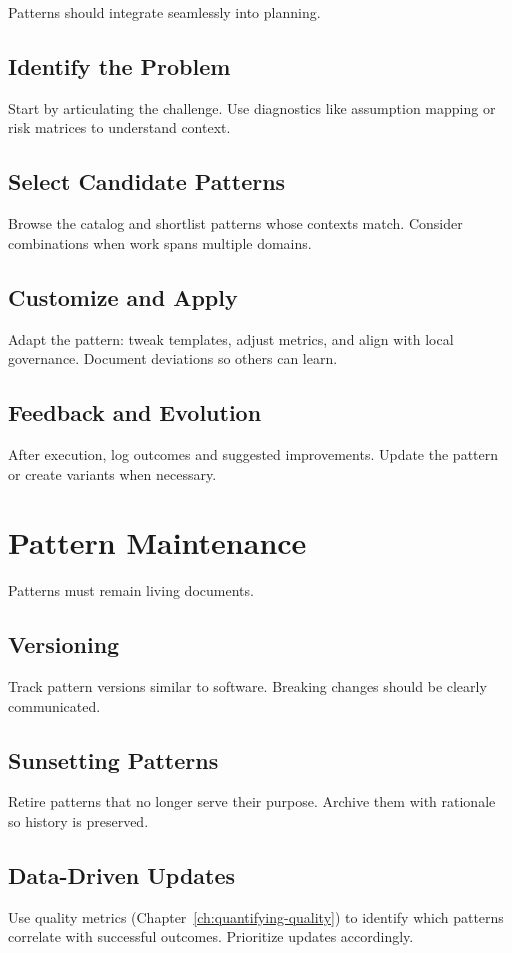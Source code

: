 Patterns should integrate seamlessly into planning.

\subsection{Identify the Problem}
Start by articulating the challenge. Use diagnostics like assumption mapping or risk matrices to understand context.

\subsection{Select Candidate Patterns}
Browse the catalog and shortlist patterns whose contexts match. Consider combinations when work spans multiple domains.

\subsection{Customize and Apply}
Adapt the pattern: tweak templates, adjust metrics, and align with local governance. Document deviations so others can learn.

\subsection{Feedback and Evolution}
After execution, log outcomes and suggested improvements. Update the pattern or create variants when necessary.

\section{Pattern Maintenance}
\label{sec:pattern-maintenance}

Patterns must remain living documents.

\subsection{Versioning}
Track pattern versions similar to software. Breaking changes should be clearly communicated.

\subsection{Sunsetting Patterns}
Retire patterns that no longer serve their purpose. Archive them with rationale so history is preserved.

\subsection{Data-Driven Updates}
Use quality metrics (Chapter~\ref{ch:quantifying-quality}) to identify which patterns correlate with successful outcomes. Prioritize updates accordingly.

